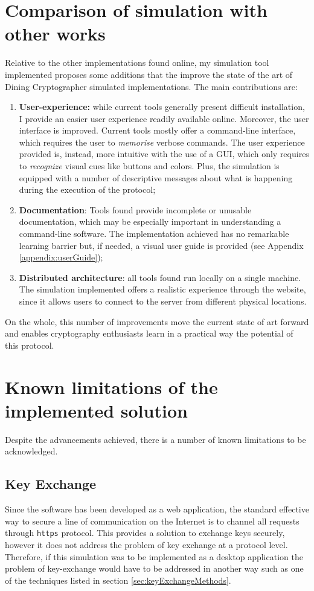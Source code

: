 \section{Comparison of simulation with other works}
Relative to the other implementations found online, my simulation tool implemented proposes some additions that the improve the state of the art of Dining Cryptographer simulated implementations. The main contributions are:
\begin{enumerate}
    \item \textbf{User-experience:} while current tools generally present difficult installation, I provide an easier user experience readily available online. Moreover, the user interface is improved. Current tools mostly offer a command-line interface, which requires the user to \textit{memorise} verbose commands. The user experience provided is, instead, more intuitive with the use of a GUI, which only requires to \textit{recognize} visual cues like buttons and colors. Plus, the simulation is equipped with a number of descriptive messages about what is happening during the execution of the protocol;
    \item \textbf{Documentation}: Tools found provide incomplete or unusable documentation, which may be especially important in understanding a command-line software. The implementation achieved has no remarkable learning barrier but, if needed, a visual user guide is provided (see Appendix \ref{appendix:userGuide});
    \item \textbf{Distributed architecture}: all tools found run locally on a single machine. The simulation implemented offers a realistic experience through the website, since it allows users to connect to the server from different physical locations.
\end{enumerate}

On the whole, this number of improvements move the current state of art forward and enables cryptography enthusiasts learn in a practical way the potential of this protocol.

\section{Known limitations of the implemented solution}
Despite the advancements achieved, there is a number of known limitations to be acknowledged. 

\subsection{Key Exchange}
Since the software has been developed as a web application, the standard effective way to secure a line of communication on the Internet is to channel all requests through \lstinline{https} protocol. This provides a solution to exchange keys securely, however it does not address the problem of key exchange at a protocol level. Therefore, if this simulation was to be implemented as a desktop application the problem of key-exchange would have to be addressed in another way such as one of the techniques listed in section \ref{sec:keyExchangeMethods}.

